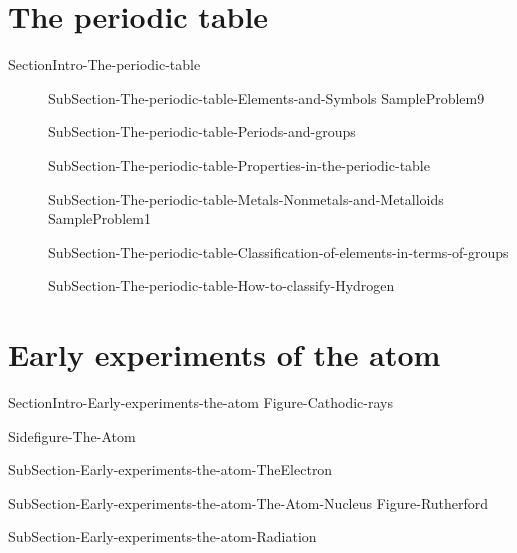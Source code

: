 \documentclass[main.tex]{subfiles}
\begin{document}
\section{The periodic table}{SectionIntro-The-periodic-table}
\sloppy\begin{description}
\item[]{SubSection-The-periodic-table-Elements-and-Symbols}
{SampleProblem9}
\item[]{SubSection-The-periodic-table-Periods-and-groups}
\item[]{SubSection-The-periodic-table-Properties-in-the-periodic-table}
\item[]{SubSection-The-periodic-table-Metals-Nonmetals-and-Metalloids}
{SampleProblem1}
\item[]{SubSection-The-periodic-table-Classification-of-elements-in-terms-of-groups}
\hspace{0cm}{Figure-The-periodic-table}
\item[]{SubSection-The-periodic-table-How-to-classify-Hydrogen}
\end{description}
 
\section{Early experiments of the atom}{SectionIntro-Early-experiments-the-atom}
{Figure-Cathodic-rays}
\sloppy\begin{description}
{Sidefigure-The-Atom}
\item[\docfilehook{Charge to mass ratio of an electron}{}] {SubSection-Early-experiments-the-atom-TheElectron}
\item[\docfilehook{The atom nucleus}{}] {SubSection-Early-experiments-the-atom-The-Atom-Nucleus}
{Figure-Rutherford}
\item[\docfilehook{Radiation}{}] {SubSection-Early-experiments-the-atom-Radiation}
\end{description}
 
\end{document}

